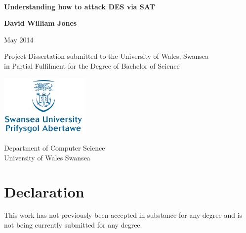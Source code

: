 \documentclass[11pt,a4paper, notitlepage]{report}
\begin{document}
\thispagestyle{empty}

${ \ } $ \vspace{4cm}
%
%

\begin{center}
{\huge \bf Understanding how to attack DES via SAT}
\end{center}

\begin{center}
{\large \bf David William Jones}
\end{center}

\begin{center}
May 2014
\end{center}

\vspace{2.5cm}

\begin{abstract}

\end{abstract}


\vfill

\begin{center}
Project Dissertation submitted to the University of Wales, Swansea\\
in Partial Fulfilment for the Degree of Bachelor of Science
\end{center}

\begin{center}
\includegraphics[scale=0.6]{SwanseaUniversityLogo.png}
\end{center}

\begin{center}
Department of Computer Science\\
University of Wales Swansea
\end{center}

\thispagestyle{empty}

\newpage

\thispagestyle{empty}

\section*{Declaration}

This work has not previously been accepted in substance for any degree
and is not being currently submitted for any degree.
\end{document}
